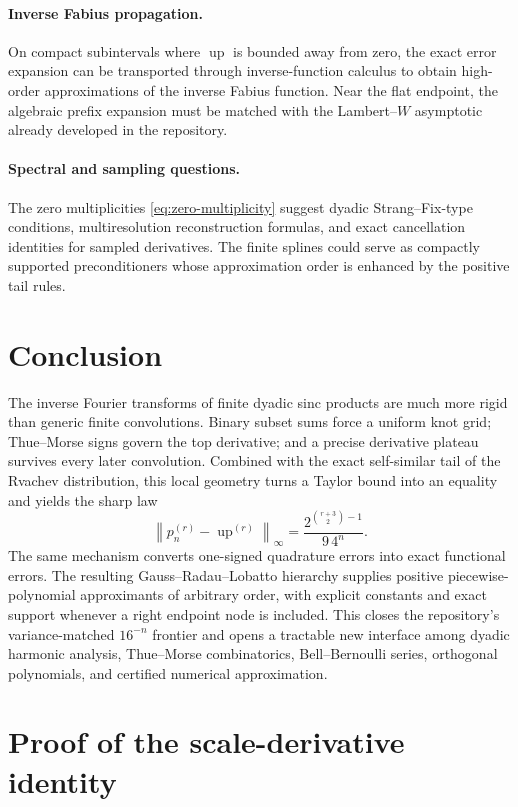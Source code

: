 \documentclass[11pt]{article}
\theoremstyle{definition}
\theoremstyle{remark}
\newcommand{\Up}{\operatorname{up}}
\newcommand{\norm}[1]{\left\lVert #1\right\rVert}
\begin{document}
\paragraph{Inverse Fabius propagation.}
On compact subintervals where $\Up$ is bounded away from zero, the exact error expansion
can be transported through inverse-function calculus to obtain high-order approximations
of the inverse Fabius function.  Near the flat endpoint, the algebraic prefix expansion
must be matched with the Lambert--$W$ asymptotic already developed in the repository.

\paragraph{Spectral and sampling questions.}
The zero multiplicities \cref{eq:zero-multiplicity} suggest dyadic Strang--Fix-type
conditions, multiresolution reconstruction formulas, and exact cancellation identities
for sampled derivatives.  The finite splines could serve as compactly supported
preconditioners whose approximation order is enhanced by the positive tail rules.

\section{Conclusion}

The inverse Fourier transforms of finite dyadic sinc products are much more rigid than
generic finite convolutions.  Binary subset sums force a uniform knot grid; Thue--Morse
signs govern the top derivative; and a precise derivative plateau survives every later
convolution.  Combined with the exact self-similar tail of the Rvachev distribution,
this local geometry turns a Taylor bound into an equality and yields the sharp law
\[
 \norm{p_n^{(r)}-\Up^{(r)}}_\infty
 =\frac{2^{\binom{r+3}{2}-1}}{9\,4^n}.
\]
The same mechanism converts one-signed quadrature errors into exact functional errors.
The resulting Gauss--Radau--Lobatto hierarchy supplies positive piecewise-polynomial
approximants of arbitrary order, with explicit constants and exact support whenever a
right endpoint node is included.  This closes the repository's variance-matched
$16^{-n}$ frontier and opens a tractable new interface among dyadic harmonic analysis,
Thue--Morse combinatorics, Bell--Bernoulli series, orthogonal polynomials, and certified
numerical approximation.

\appendix

\section{Proof of the scale-derivative identity}
\label{app:Ah}
\end{document}
